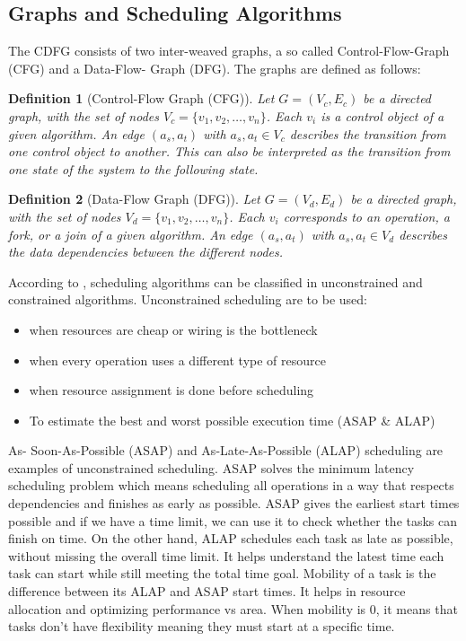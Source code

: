\documentclass[conference]{IEEEtran}
\newtheorem{definition}{Definition}
\begin{document}
\subsection{Graphs and Scheduling Algorithms}
\label{subsec: graphs}
The CDFG consists of two inter-weaved graphs, a so called Control-Flow-Graph (CFG) and a Data-Flow-
Graph (DFG). The graphs are defined as follows:
\begin{definition}[Control-Flow Graph (CFG)]
\label{def:cfg}
Let $G = (V_c, E_c)$ be a directed graph, with the set of nodes $V_c = \{v_1, v_2, \ldots, v_n\}$. Each $v_i$ is a control object of a given algorithm. An edge $(a_s, a_t)$ with $a_s, a_t \in V_c$ describes the transition from one control object to another. This can also be interpreted as the transition from one state of the system to the following state.
\end{definition}

\begin{definition}[Data-Flow Graph (DFG)]
\label{def:dfg}
Let $G = (V_d, E_d)$ be a directed graph, with the set of nodes $V_d = \{v_1, v_2, \ldots, v_n\}$. Each $v_i$ corresponds to an operation, a fork, or a join of a given algorithm. An edge $(a_s, a_t)$ with $a_s, a_t \in V_d$ describes the data dependencies between the different nodes.
\end{definition}

According to \cite{Saraju01}, scheduling algorithms can be classified in unconstrained and constrained algorithms. Unconstrained scheduling are to be used: 
\begin{itemize}
    \item when resources are cheap or wiring is the bottleneck
    \item when every operation uses a different type of resource
    \item when resource assignment is done before scheduling
    \item To estimate the best and worst possible execution time (ASAP \& ALAP)
    
\end{itemize}
As- Soon-As-Possible (ASAP) and As-Late-As-Possible (ALAP) scheduling are examples of unconstrained scheduling. ASAP solves the minimum latency scheduling problem which means scheduling all operations in a way that respects dependencies and finishes as early as possible. ASAP gives the earliest start times possible and if we have a time limit, we can use it to check whether the tasks can finish on time. On the other hand, ALAP schedules each task as late as possible, without missing the overall time limit. It helps understand the latest time each task can start while still meeting the total time goal. Mobility of a task is the difference between its ALAP and ASAP start times. It helps in resource allocation and optimizing performance vs area. When mobility is 0, it means that tasks don't have flexibility meaning they must start at a specific time. 
\end{document}
